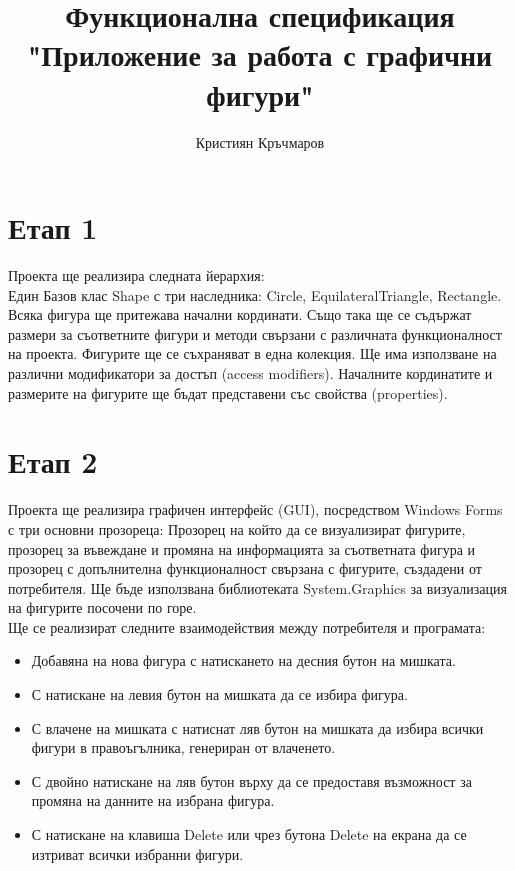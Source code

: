 \documentclass[a4paper,fleqn,12pt]{article}
\title{
  Функционална спецификация \\
  \large "Приложение за работа с графични фигури"}
\author{Кристиян Кръчмаров}
\begin{document}
\maketitle

\newpage
{}

\section{Етап 1}
Проекта ще реализира следната йерархия: \\
Един Базов клас Shape с три наследника: Circle, EquilateralTriangle, Rectangle. 
Всяка фигура ще притежава начални кординати.
Също така ще се съдържат размери за съответните фигури и методи свързани с различната функционалност на проекта. 
Фигурите ще се съхраняват в една колекция.
Ще има използване на различни модификатори за достъп (access modifiers).
Началните кординатите и размерите на фигурите ще бъдат представени със свойства (properties).

\section{Етап 2}
Проекта ще реализира графичен интерфейс (GUI), посредством Windows Forms с три основни прозореца: Прозорец на който да се визуализират фигурите, прозорец за въвеждане и промяна на информацията за съответната фигура и прозорец с допълнителна функционалност свързана с фигурите, създадени от потребителя. 
Ще бъде използвана библиотеката System.Graphics за визуализация на фигурите посочени по горе. \\
Ще се реализират следните взаимодействия между потребителя и програмата: 
\begin{itemize}
\item Добавяна на нова фигура с натискането на десния бутон на мишката. 
\item С натискане на левия бутон на мишката да се избира фигура.
\item С влачене на мишката с натиснат ляв бутон на мишката да избира всички фигури в правоъгълника, генериран от влаченето. 
\item С двойно натискане на ляв бутон върху да се предоставя възможност за промяна на данните на избрана фигура.
\item С натискане на клавиша Delete или чрез бутона Delete на екрана да се изтриват всички избранни фигури. 
\end{itemize}
\end{document}
